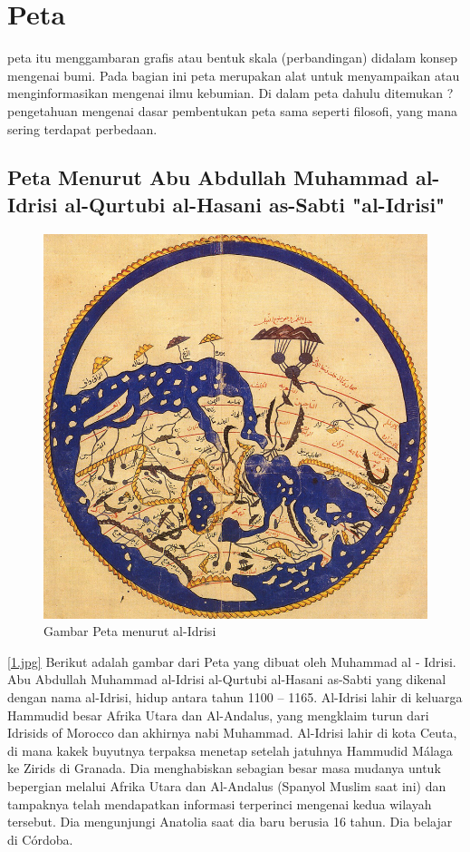 
\section{Peta}
	peta itu menggambaran  grafis atau bentuk skala (perbandingan) didalam konsep mengenai bumi. Pada bagian ini peta merupakan alat untuk menyampaikan atau menginformasikan mengenai ilmu kebumian. Di dalam peta dahulu ditemukan ? pengetahuan mengenai dasar pembentukan peta sama seperti filosofi, yang mana sering terdapat perbedaan.

\subsection{Peta Menurut Abu Abdullah Muhammad al-Idrisi al-Qurtubi al-Hasani as-Sabti "al-Idrisi"}
	\begin{figure} [ht]
	\centerline{\includegraphics[width=1\textwidth]{figures/1.jpg}}
	\caption{Gambar Peta menurut al-Idrisi}
	\label{Petaal-Idrisi}
	\end{figure}
	\ref{1.jpg} Berikut adalah gambar dari Peta yang dibuat oleh Muhammad al - Idrisi.
	Abu Abdullah Muhammad al-Idrisi al-Qurtubi al-Hasani as-Sabti yang dikenal dengan nama al-Idrisi, hidup antara tahun 1100 – 1165. Al-Idrisi lahir di keluarga Hammudid besar Afrika Utara dan Al-Andalus, yang mengklaim turun dari Idrisids of Morocco dan akhirnya nabi Muhammad. Al-Idrisi lahir di kota Ceuta, di mana kakek buyutnya terpaksa menetap setelah jatuhnya Hammudid Málaga ke Zirids di Granada. Dia menghabiskan sebagian besar masa mudanya untuk bepergian melalui Afrika Utara dan Al-Andalus (Spanyol Muslim saat ini) dan tampaknya telah mendapatkan informasi terperinci mengenai kedua wilayah tersebut. Dia mengunjungi Anatolia saat dia baru berusia 16 tahun. Dia belajar di Córdoba.
